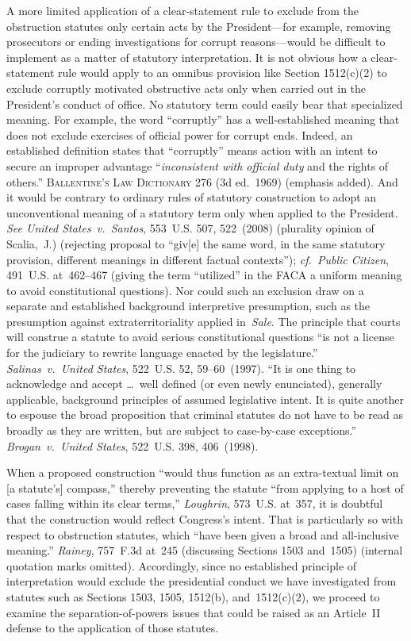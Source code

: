 A more limited application of a clear-statement rule to exclude from the obstruction statutes only certain acts by the President---for example, removing prosecutors or ending investigations for corrupt reasons---would be difficult to implement as a matter of statutory interpretation.
It is not obvious how a clear-statement rule would apply to an omnibus provision like Section 1512(c)(2) to exclude corruptly motivated obstructive acts only when carried out in the President's conduct of office.
No statutory term could easily bear that specialized meaning.
For example, the word ``corruptly'' has a well-established meaning that does not exclude exercises of official power for corrupt ends.
Indeed, an established definition states that ``corruptly'' means action with an intent to secure an improper advantage ``\textit{inconsistent with official duty} and the rights of others.''
\textsc{Ballentine's Law Dictionary} 276 (3d ed.~1969) (emphasis added).
And it would be contrary to ordinary rules of statutory construction to adopt an unconventional meaning of a statutory term only when applied to the President.
\textit{See United States~v.\ Santos}, 553~U.S. 507, 522~(2008) (plurality opinion of Scalia,~J.) (rejecting proposal to ``giv[e] the same word, in the same statutory provision, different meanings in different factual contexts'');
\textit{cf.~Public Citizen}, 491~U.S. at~462--467 (giving the term ``utilized'' in the FACA a uniform meaning to avoid constitutional questions).
Nor could such an exclusion draw on a separate and established background interpretive presumption, such as the presumption against extraterritoriality applied in~\textit{Sale}.
The principle that courts will construe a statute to avoid serious constitutional questions ``is not a license for the judiciary to rewrite language enacted by the legislature.''
\textit{Salinas~v.\ United States}, 522~U.S. 52, 59--60~(1997).
``It is one thing to acknowledge and accept \dots\ well defined (or even newly enunciated), generally applicable, background principles of assumed legislative intent.
It is quite another to espouse the broad proposition that criminal statutes do not have to be read as broadly as they are written, but are subject to case-by-case exceptions.''
\textit{Brogan~v.\ United States}, 522~U.S. 398, 406~(1998).

When a proposed construction ``would thus function as an extra-textual limit on [a statute's] compass,'' thereby preventing the statute ``from applying to a host of cases falling within its clear terms,'' \textit{Loughrin}, 573~U.S. at~357, it is doubtful that the construction would reflect Congress's intent.
That is particularly so with respect to obstruction statutes, which ``have been given a broad and all-inclusive meaning.''
\textit{Rainey}, 757~F.3d at~245 (discussing Sections 1503 and~1505) (internal quotation marks omitted).
Accordingly, since no established principle of interpretation would exclude the presidential conduct we have investigated from statutes such as Sections 1503, 1505, 1512(b), and~1512(c)(2), we proceed to examine the separation-of-powers issues that could be raised as an Article~II defense to the application of those statutes.

